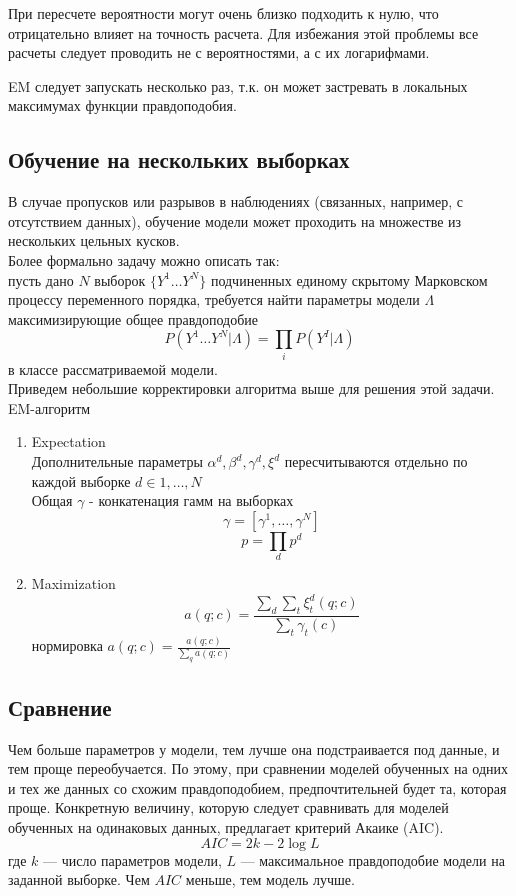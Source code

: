 \documentclass{matmex-diploma-custom}
\begin{document}
\begin{remark} При пересчете вероятности могут очень близко подходить к нулю, что отрицательно влияет на точность расчета. Для избежания этой проблемы все расчеты следует проводить не с вероятностями, а с их логарифмами.
\end{remark}
\begin{remark} EM следует запускать несколько раз, т.к. он может застревать в локальных максимумах функции правдоподобия.
\end{remark}

\subsection{Обучение на нескольких выборках}
В случае пропусков или разрывов в наблюдениях (связанных, например, с отсутствием данных), обучение модели может проходить на множестве из нескольких цельных кусков.
\\
Более формально задачу можно описать так: 
\\
пусть дано $ N $ выборок $ \{Y^{1} \ldots Y^{N}\}$ подчиненных единому скрытому Марковском процессу переменного порядка, требуется найти параметры модели $\Lambda$ максимизирующие общее правдоподобие 
$$P(Y^{1} \ldots Y^{N}| \Lambda) = \prod_{i}{P(Y^{I}|\Lambda)}$$
в классе рассматриваемой модели.
\\
Приведем небольшие корректировки алгоритма выше для решения этой задачи.
\\
EM-алгоритм
\begin{enumerate}
\item Expectation\\
Дополнительные параметры $\alpha^{d}, \beta^{d}, \gamma^{d}, \xi^{d}$ пересчитываются отдельно по каждой выборке $d \in {1, \ldots, N}$
\\
Общая $\gamma$ - конкатенация гамм на выборках
$$ \gamma = [\gamma^{1}, \ldots ,\gamma^{N}] $$
$$ p = \prod_{d}{p^{d}}$$
\item Maximization\\
$$ a(q; c) = \frac{\sum_{d}{\sum_{t}{\xi^{d}_{t}(q;c)}}}{\sum_{t}{\gamma_{t}(c)}} $$
нормировка
$ a(q; c) = \frac{a(q;c)}{\sum_{q}{a(q;c)}} $
\end{enumerate}

\subsection{Сравнение}
Чем больше параметров у модели, тем лучше она подстраивается под данные, и тем проще переобучается. 
По этому, при сравнении моделей обученных на одних и тех же данных со схожим правдоподобием, предпочтительней будет та, которая проще. 
Конкретную величину, которую следует сравнивать для моделей обученных на одинаковых данных, предлагает критерий Акаике (AIC).
$$ AIC = 2k-2\log{L} $$ 
где $ k $ --- число параметров модели, $ L $ --- максимальное правдоподобие модели на заданной выборке. Чем $AIC$ меньше, тем модель лучше. 
\end{document}
